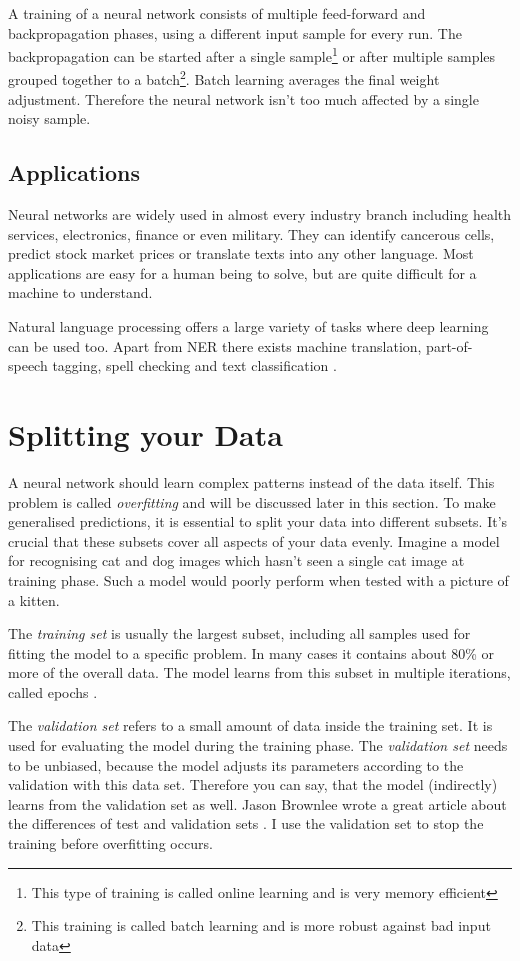 A training of a neural network consists of multiple feed-forward and backpropagation phases, using a different input sample for every run. The backpropagation can be started after a single sample\footnote{This type of training is called online learning and is very memory efficient} or after multiple samples grouped together to a batch\footnote{This training is called batch learning and is more robust against bad input data}. Batch learning averages the final weight adjustment. Therefore the neural network isn't too much affected by a single noisy sample.

\subsection{Applications}

Neural networks are widely used in almost every industry branch including health services, electronics, finance or even military. They can identify cancerous cells, predict stock market prices or translate texts into any other language. Most applications are easy for a human being to solve, but are quite difficult for a machine to understand.

Natural language processing offers a large variety of tasks where deep learning can be used too. Apart from NER there exists machine translation, part-of-speech tagging, spell checking and text classification \cite{olga17}.

\section{Splitting your Data}

A neural network should learn complex patterns instead of the data itself. This problem is called \emph{overfitting} and will be discussed later in this section. To make generalised predictions, it is essential to split your data into different subsets. It's crucial that these subsets cover all aspects of your data evenly. Imagine a model for recognising cat and dog images which hasn't seen a single cat image at training phase. Such a model would poorly perform when tested with a picture of a kitten.

The \emph{training set} is usually the largest subset, including all samples used for fitting the model to a specific problem. In many cases it contains about 80\% or more of the overall data. The model learns from this subset in multiple iterations, called epochs \cite{shah17}.

The \emph{validation set} refers to a small amount of data inside the training set. It is used for evaluating the model during the training phase. The \emph{validation set} needs to be unbiased, because the model adjusts its parameters according to the validation with this data set. Therefore you can say, that the model (indirectly) learns from the validation set as well. Jason Brownlee wrote a great article about the differences of test and validation sets \cite{brown17}. I use the validation set to stop the training before overfitting occurs.

